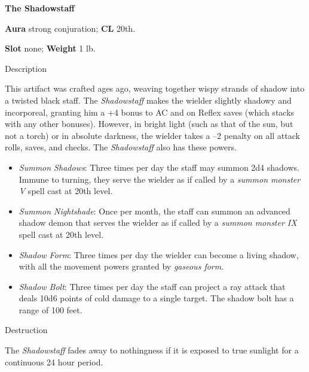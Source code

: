 \textbf{The Shadowstaff}
				
\textbf{Aura} strong conjuration; \textbf{CL} 20th.
				
\textbf{Slot} none; \textbf{Weight} 1 lb.
				
Description
				
This artifact was crafted ages ago, weaving together wispy strands of shadow into a twisted black staff. The \textit{Shadowstaff }makes the wielder slightly shadowy and incorporeal, granting him a +4 bonus to AC and on Reflex saves (which stacks with any other bonuses). However, in bright light (such as that of the sun, but not a torch) or in absolute darkness, the wielder takes a --2 penalty on all attack rolls, saves, and checks. The \textit{Shadowstaff} also has these powers.
				\begin{itemize}\item  \textit{Summon Shadows}: Three times per day the staff may summon 2d4 shadows. Immune to turning, they serve the wielder as if called by a \textit{summon monster V }spell cast at 20th level.
				\item  \textit{Summon Nightshade}: Once per month, the staff can summon an advanced shadow demon that serves the wielder as if called by a \textit{summon monster IX} spell cast at 20th level.
				\item  \textit{Shadow Form}: Three times per day the wielder can become a living shadow, with all the movement powers granted by \textit{gaseous form}. 
				\item  \textit{Shadow Bolt}: Three times per day the staff can project a ray attack that deals 10d6 points of cold damage to a single target. The shadow bolt has a range of 100 feet. 
\end{itemize}
				
Destruction
				
The \textit{Shadowstaff} fades away to nothingness if it is exposed to true sunlight for a continuous 24 hour period.
        	
